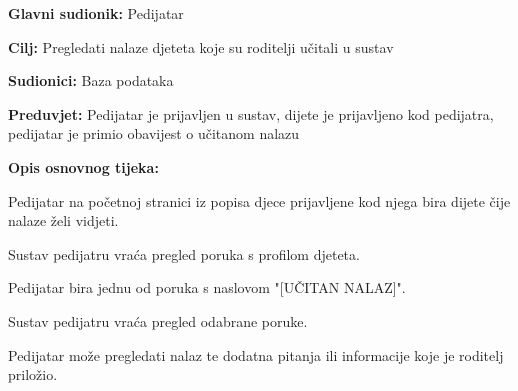 					\noindent {}
					\begin{packed_item}
						
						\item \textbf{Glavni sudionik: }Pedijatar
						\item  \textbf{Cilj:} Pregledati nalaze djeteta koje su roditelji učitali u sustav
						\item  \textbf{Sudionici:} Baza podataka
						\item  \textbf{Preduvjet:} Pedijatar je prijavljen u sustav, dijete je prijavljeno kod pedijatra, pedijatar je primio obavijest o učitanom nalazu
						\item  \textbf{Opis osnovnog tijeka:}
						
						\item[] \begin{packed_enum}
							
							\item Pedijatar na početnoj stranici iz popisa djece prijavljene kod njega bira dijete čije nalaze želi vidjeti.
							\item Sustav pedijatru vraća pregled poruka s profilom djeteta.
							\item Pedijatar bira jednu od poruka s naslovom "[UČITAN NALAZ]".
							\item Sustav pedijatru vraća pregled odabrane poruke.
							\item Pedijatar može pregledati nalaz te dodatna pitanja ili informacije koje je roditelj priložio.
						\end{packed_enum}
						
						
					\end{packed_item}
					
